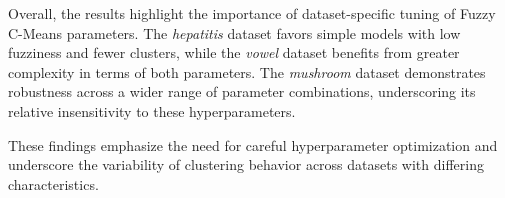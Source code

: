 Overall, the results highlight the importance of dataset-specific tuning of Fuzzy C-Means parameters. The \textit{hepatitis} dataset favors simple models with low fuzziness and fewer clusters, while the \textit{vowel} dataset benefits from greater complexity in terms of both parameters. The \textit{mushroom} dataset demonstrates robustness across a wider range of parameter combinations, underscoring its relative insensitivity to these hyperparameters.

These findings emphasize the need for careful hyperparameter optimization and underscore the variability of clustering behavior across datasets with differing characteristics.


